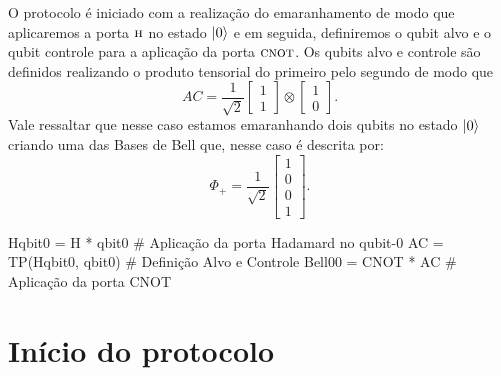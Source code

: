 O protocolo é iniciado com a realização do emaranhamento de modo que aplicaremos a porta \(\operatorname{\textsc{h}}\) no estado \(\ket{0}\) e em seguida, definiremos o qubit alvo e o qubit controle para a aplicação da porta \(\operatorname{\textsc{cnot}}\). Os qubits alvo e controle são definidos realizando o produto tensorial do primeiro pelo segundo de modo que
\[
  AC = \frac{1}{\sqrt{2}} \begin{bmatrix} 1 \\ 1 \end{bmatrix} \otimes \begin{bmatrix} 1 \\ 0 \end{bmatrix}.
\]
Vale ressaltar que nesse caso estamos emaranhando dois qubits no estado \(\ket{0}\) criando uma das Bases de Bell que, nesse caso é descrita por:
\[
  \Phi_+ = \frac{1}{\sqrt{2}} \begin{bmatrix} 1 \\ 0 \\ 0 \\ 1 \end{bmatrix}.
\]
\begin{pycode}
    Hqbit0 = H * qbit0      # Aplicação da porta Hadamard no qubit-0
    AC = TP(Hqbit0, qbit0)  # Definição Alvo e Controle
    Bell00 = CNOT * AC      # Aplicação da porta CNOT
\end{pycode}

\section{Início do protocolo}\label{emaranhamento}

